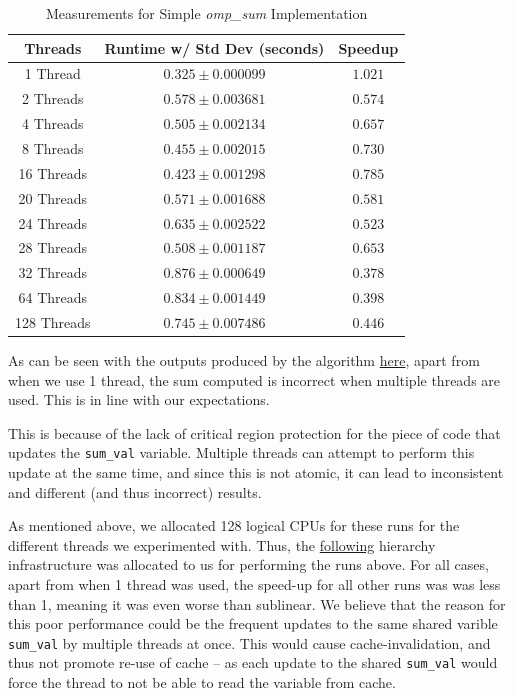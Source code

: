 \documentclass[a4paper,10pt]{article}
\begin{document}
\begin{table}[h!]
\centering
\begin{tabular}{|c|c|c|}
\hline
\textbf{Threads} & \textbf{Runtime w/ Std Dev (seconds)} & \textbf{Speedup} \\
\hline
1 Thread  & $0.325 \pm 0.000099$  & $1.021$ \\
2 Threads & $0.578 \pm 0.003681$  & $0.574$ \\
4 Threads & $0.505 \pm 0.002134$  & $0.657$ \\
8 Threads & $0.455 \pm 0.002015$  & $0.730$ \\
16 Threads & $0.423 \pm 0.001298$ & $0.785$ \\
20 Threads & $0.571 \pm 0.001688$ & $0.581$ \\
24 Threads & $0.635 \pm 0.002522$ & $0.523$ \\
28 Threads & $0.508 \pm 0.001187$ & $0.653$ \\
32 Threads & $0.876 \pm 0.000649$ & $0.378$ \\
64 Threads & $0.834 \pm 0.001449$ & $0.398$ \\
128 Threads & $0.745 \pm 0.007486$ & $0.446$ \\
\hline
\end{tabular}
\caption{Measurements for Simple \textit{omp\_sum} Implementation}
\end{table}

As can be seen with the outputs produced by the algorithm \href{https://github.com/paulmyr/DD2356-MethodsHPC/blob/master/3_open_mp/exercise3/outputs/omp_output.txt}{here}, apart from when we use 1 thread, the sum computed is incorrect when multiple threads are used. This is in line with our expectations. 

This is because of the lack of critical region protection for the piece of code that updates the \verb|sum_val| variable. Multiple threads can attempt to perform this update at the same time, and since this is not atomic, it can lead to inconsistent and different (and thus incorrect) results.  

As mentioned above, we allocated 128 logical CPUs for these runs for the different threads we experimented with. Thus, the \href{https://github.com/paulmyr/DD2356-MethodsHPC/blob/master/3_open_mp/img/ex3/ex3_topology_omp_sum.svg}{following} hierarchy infrastructure was allocated to us for performing the runs above. For all cases, apart from when 1 thread was used, the speed-up for all other runs was was less than 1, meaning it was even worse than sublinear. We believe that the reason for this poor performance could be the frequent updates to the same shared varible \verb|sum_val| by multiple threads at once. This would cause cache-invalidation, and thus not promote re-use of cache -- as each update to the shared \verb|sum_val| would force the thread to not be able to read the variable from cache. 
\end{document}
